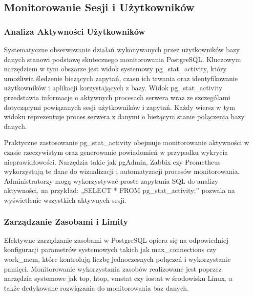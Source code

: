 \documentclass[letterpaper,10pt,polish]{sphinxmanual}
\begin{document}
\subsection{Monitorowanie   Sesji   i       Użytkowników}
\label{\detokenize{rozdzial2/repo-wspolne/index:monitorowanie-sesji-i-uzytkownikow}}

\subsubsection{Analiza Aktywności      Użytkowników}
\label{\detokenize{rozdzial2/repo-wspolne/index:analiza-aktywnosci-uzytkownikow}}
\sphinxAtStartPar
Systematyczne obserwowanie działań wykonywanych przez użytkowników bazy danych stanowi podstawę skutecznego monitorowania PostgreSQL. Kluczowym narzędziem w tym obszarze jest widok systemowy pg\_stat\_activity, który umożliwia śledzenie bieżących zapytań, czasu ich trwania oraz identyfikowanie użytkowników i aplikacji korzystających z bazy. Widok pg\_stat\_activity przedstawia informacje o aktywnych procesach serwera wraz ze szczegółami dotyczącymi powiązanych sesji użytkowników i zapytań. Każdy wiersz w tym widoku reprezentuje proces serwera z danymi o bieżącym stanie połączenia bazy danych.

\sphinxAtStartPar
Praktyczne zastosowanie pg\_stat\_activity obejmuje monitorowanie aktywności w czasie rzeczywistym oraz generowanie powiadomień w przypadku wykrycia nieprawidłowości. Narzędzia takie jak pgAdmin, Zabbix czy Prometheus wykorzystują te dane do wizualizacji i automatyzacji procesów monitorowania. Administratorzy mogą wykorzystywać proste zapytania SQL do analizy aktywności, na przykład: „SELECT * FROM pg\_stat\_activity;” pozwala na wyświetlenie wszystkich aktywnych sesji.


\subsubsection{Zarządzanie     Zasobami        i       Limity}
\label{\detokenize{rozdzial2/repo-wspolne/index:zarzadzanie-zasobami-i-limity}}
\sphinxAtStartPar
Efektywne zarządzanie zasobami w PostgreSQL opiera się na odpowiedniej konfiguracji parametrów systemowych takich jak max\_connections czy work\_mem, które kontrolują liczbę jednoczesnych połączeń i wykorzystanie pamięci. Monitorowanie wykorzystania zasobów realizowane jest poprzez narzędzia systemowe jak top, htop, vmstat czy iostat w środowisku Linux, a także dedykowane rozwiązania do monitorowania baz danych.
\end{document}
